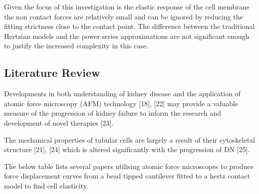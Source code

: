 \documentclass[
  paper=a4,
  ,captions=tableheading
]{scrartcl}
\begin{document}
Given the focus of this investigation is the elastic response of the
cell membrane the non contact forces are relatively small and can be
ignored by reducing the fitting strictness close to the contact point.
The difference between the traditional Hertzian models and the power
series approximations are not significant enough to justify the
increased complexity in this case.

\subsection{Literature Review}\label{literature-review}

Developments in both understanding of kidney disease and the application
of atomic force microscopy (AFM) technology {[}18{]}, {[}22{]} may
provide a valuable measure of the progression of kidney failure to
inform the research and development of novel therapies {[}23{]}.

The mechanical properties of tubular cells are largely a result of their
cytoskeletal structure {[}21{]}, {[}24{]} which is altered significantly
with the progression of DN {[}25{]}.

The below table lists several papers utilising atomic force microscopes
to produce force displacement curves from a bead tipped cantilever
fitted to a hertz contact model to find cell elasticity.
\end{document}
